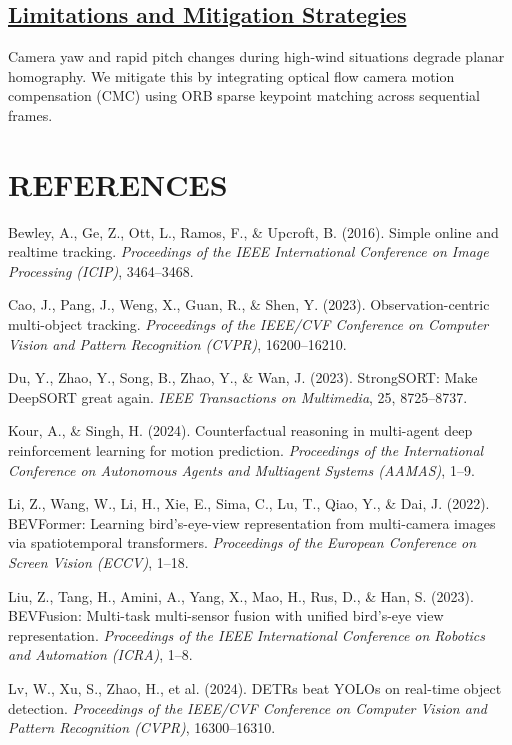 \documentclass[12pt]{article}
\newenvironment{references}{
  \clearpage
  \section*{\centering \textbf{REFERENCES}}
  \begin{list}{}{
    \setlength{\leftmargin}{0.5in}
    \setlength{\itemindent}{-0.5in}
    \setlength{\itemsep}{\baselineskip}
    \setlength{\parsep}{0pt}
  }
}{
  \end{list}
}
\begin{document}
\subsection*{\underline{\textbf{Limitations and Mitigation Strategies}}}
Camera yaw and rapid pitch changes during high-wind situations degrade planar homography. We mitigate this by integrating optical flow camera motion compensation (CMC) using ORB sparse keypoint matching across sequential frames.

\clearpage

\begin{references}
\item Bewley, A., Ge, Z., Ott, L., Ramos, F., \& Upcroft, B. (2016). Simple online and realtime tracking. \textit{Proceedings of the IEEE International Conference on Image Processing (ICIP)}, 3464--3468.
\item Cao, J., Pang, J., Weng, X., Guan, R., \& Shen, Y. (2023). Observation-centric multi-object tracking. \textit{Proceedings of the IEEE/CVF Conference on Computer Vision and Pattern Recognition (CVPR)}, 16200--16210.
\item Du, Y., Zhao, Y., Song, B., Zhao, Y., \& Wan, J. (2023). StrongSORT: Make DeepSORT great again. \textit{IEEE Transactions on Multimedia}, 25, 8725--8737.
\item Kour, A., \& Singh, H. (2024). Counterfactual reasoning in multi-agent deep reinforcement learning for motion prediction. \textit{Proceedings of the International Conference on Autonomous Agents and Multiagent Systems (AAMAS)}, 1--9.
\item Li, Z., Wang, W., Li, H., Xie, E., Sima, C., Lu, T., Qiao, Y., \& Dai, J. (2022). BEVFormer: Learning bird's-eye-view representation from multi-camera images via spatiotemporal transformers. \textit{Proceedings of the European Conference on Screen Vision (ECCV)}, 1--18.
\item Liu, Z., Tang, H., Amini, A., Yang, X., Mao, H., Rus, D., \& Han, S. (2023). BEVFusion: Multi-task multi-sensor fusion with unified bird's-eye view representation. \textit{Proceedings of the IEEE International Conference on Robotics and Automation (ICRA)}, 1--8.
\item Lv, W., Xu, S., Zhao, H., et al. (2024). DETRs beat YOLOs on real-time object detection. \textit{Proceedings of the IEEE/CVF Conference on Computer Vision and Pattern Recognition (CVPR)}, 16300--16310.

\end{references}
\end{document}
